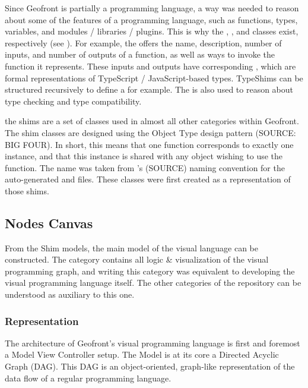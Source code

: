 Since Geofront is partially a programming language, a way was needed to reason about some of the features of a programming language, such as functions, types, variables, and modules / libraries / plugins. 
This is why the , ,  and  classes exist, respectively (see ). 
For example, the  offers the name, description, number of inputs, and number of outputs of a function, as well as ways to invoke the function it represents.
These inputs and outputs have corresponding , which are formal representations of TypeScript / JavaScript-based types. 
TypeShims can be structured recursively to define a  for example. The  is also used to reason about type checking and type compatibility.

the shims are a set of classes used in almost all other categories within Geofront. 
The shim classes are designed using the Object Type design pattern (SOURCE: BIG FOUR). 
In short, this means that one function corresponds to exactly one  instance, and that this instance is shared with any object wishing to use the function. 
The name  was taken from 's (SOURCE) naming convention for the auto-generated  and  files. These classes were first created as a representation of those shims.


\subsection{Nodes Canvas}
From the Shim models, the main model of the visual language can be constructed. 
The  category contains all logic \& visualization of the visual programming graph, and writing this category was equivalent to developing the visual programming language itself. 
The other categories of the repository can be understood as auxiliary to this one.

\subsubsection*{Representation}


The architecture of Geofront's visual programming language is first and foremost a Model View Controller setup. 
The Model is at its core a Directed Acyclic Graph (DAG). 
This DAG is an object-oriented, graph-like representation of the data flow of a regular programming language. 

